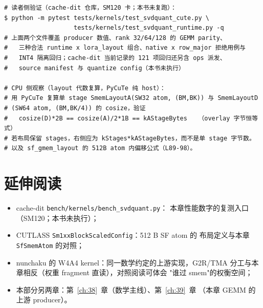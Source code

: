 \begin{lstlisting}[style=console]
# 读者侧验证（cache-dit 仓库，SM120 卡；本书未复跑）：
$ python -m pytest tests/kernels/test_svdquant_cute.py \
                   tests/kernels/test_svdquant_runtime.py -q
# 上面两个文件覆盖 producer 数值、rank 32/64/128 的 GEMM parity、
#   三种合法 runtime x lora_layout 组合、native x row_major 拒绝用例与
#   INT4 隔离回归；cache-dit 当前记录的 121 项回归还另含 ops 派发、
#   source manifest 与 quantize config（本书未执行）

# CPU 侧观察（layout 代数复算，PyCuTe 纯 host）：
# 用 PyCuTe 复算单 stage SmemLayoutA(SW32 atom, (BM,BK)) 与 SmemLayoutD
# (SW64 atom, (BM,BK/4)) 的 cosize，验证
#   cosize(D)*2B == cosize(A)/2*1B == kAStageBytes   （overlay 字节恒等式）
# 若布局保留 stages，右侧应为 kStages*kAStageBytes，而不是单 stage 字节数。
# 以及 sf_gmem_layout 的 512B atom 内偏移公式（L89-98）。
\end{lstlisting}

\section*{延伸阅读}

\begin{itemize}[itemsep=1pt,topsep=2pt]
  \item cache-dit \texttt{bench/kernels/bench\_svdquant.py}：
        本章性能数字的复测入口（SM120；本书未执行）；
  \item CUTLASS \texttt{Sm1xxBlockScaledConfig}：512 B SF atom 的
        布局定义与本章 \texttt{SfSmemAtom} 的对照；
  \item nunchaku 的 W4A4 kernel：同一数学约定的上游实现，G2R/TMA
        分工与本章相反（权重 fragment 直读），对照阅读可体会
        "谁过 smem"的权衡空间；
  \item 本部分另两章：第~\ref{ch:38}~章（数学主线）、第~\ref{ch:39}~章
        （本章 GEMM 的上游 producer）。
\end{itemize}
